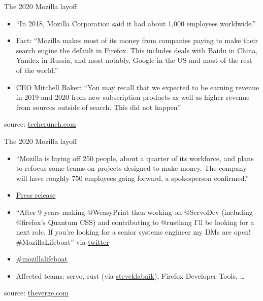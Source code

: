 \documentclass{beamer}
\begin{document}
\begin{frame}[fragile]{The 2020 Mozilla layoff}
  \begin{itemize}
    \item “In 2018, Mozilla Corporation said it had about 1,000 employees worldwide.”
    \item Fact: “Mozilla makes most of its money from companies paying to make their search engine the default in Firefox. This includes deals with Baidu in China, Yandex in Russia, and most notably, Google in the US and most of the rest of the world.”
    \item CEO Mitchell Baker: “You may recall that we expected to be earning revenue in 2019 and 2020 from new subscription products as well as higher revenue from sources outside of search. This did not happen”
  \end{itemize}
  source: \href{https://techcrunch.com/2020/01/15/mozilla-lays-off-70-as-it-waits-for-subscription-products-to-generate-revenue/}{techcrunch.com}
\end{frame}

\begin{frame}[fragile]{The 2020 Mozilla layoff}
  \begin{itemize}
    \item “Mozilla is laying off 250 people, about a quarter of its workforce, and plans to refocus some teams on projects designed to make money. The company will have roughly 750 employees going forward, a spokesperson confirmed.”
    \item \href{https://blog.mozilla.org/blog/2020/08/11/changing-world-changing-mozilla/}{Press release}
    \item “After 9 years making @WeasyPrint then working on @ServoDev (including @firefox's Quantum CSS) and contributing to @rustlang I'll be looking for a next role. If you're looking for a senior systems engineer my DMs are open! \#MozillaLifeboat” via \href{https://twitter.com/SimonSapin/status/1295818647135494151}{twitter}
    \item \href{https://mozillalifeboat.com/}{\#mozillalifeboat}
    \item Affected teams: servo, rust (via \href{https://news.ycombinator.com/item?id=24144938}{steveklabnik}), Firefox Developer Tools, …
  \end{itemize}
  source: \href{https://www.theverge.com/2020/8/11/21363424/mozilla-layoffs-quarter-staff-250-people-new-revenue-focus}{theverge.com}
\end{frame}
\end{document}
